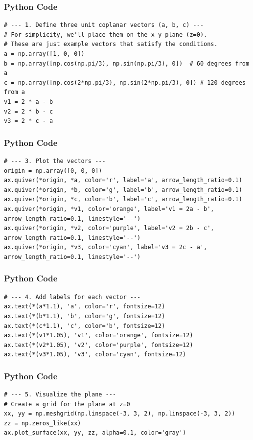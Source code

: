 \documentclass{beamer}
\begin{document}
\begin{frame}[fragile]
    \frametitle{Python Code}
    \begin{lstlisting}
# --- 1. Define three unit coplanar vectors (a, b, c) ---
# For simplicity, we'll place them on the x-y plane (z=0).
# These are just example vectors that satisfy the conditions.
a = np.array([1, 0, 0])
b = np.array([np.cos(np.pi/3), np.sin(np.pi/3), 0])  # 60 degrees from a
c = np.array([np.cos(2*np.pi/3), np.sin(2*np.pi/3), 0]) # 120 degrees from a
v1 = 2 * a - b
v2 = 2 * b - c
v3 = 2 * c - a

    \end{lstlisting}
\end{frame}
\begin{frame}[fragile]
    \frametitle{Python Code}

    \begin{lstlisting}
# --- 3. Plot the vectors ---
origin = np.array([0, 0, 0])
ax.quiver(*origin, *a, color='r', label='a', arrow_length_ratio=0.1)
ax.quiver(*origin, *b, color='g', label='b', arrow_length_ratio=0.1)
ax.quiver(*origin, *c, color='b', label='c', arrow_length_ratio=0.1)
ax.quiver(*origin, *v1, color='orange', label='v1 = 2a - b', arrow_length_ratio=0.1, linestyle='--')
ax.quiver(*origin, *v2, color='purple', label='v2 = 2b - c', arrow_length_ratio=0.1, linestyle='--')
ax.quiver(*origin, *v3, color='cyan', label='v3 = 2c - a', arrow_length_ratio=0.1, linestyle='--')

    \end{lstlisting}
\end{frame}

\begin{frame}[fragile]
    \frametitle{Python Code}

    \begin{lstlisting}
# --- 4. Add labels for each vector ---
ax.text(*(a*1.1), 'a', color='r', fontsize=12)
ax.text(*(b*1.1), 'b', color='g', fontsize=12)
ax.text(*(c*1.1), 'c', color='b', fontsize=12)
ax.text(*(v1*1.05), 'v1', color='orange', fontsize=12)
ax.text(*(v2*1.05), 'v2', color='purple', fontsize=12)
ax.text(*(v3*1.05), 'v3', color='cyan', fontsize=12)
\end{lstlisting}
\end{frame}

 
\begin{frame}[fragile]
    \frametitle{Python Code}
    \begin{lstlisting}
# --- 5. Visualize the plane ---
# Create a grid for the plane at z=0
xx, yy = np.meshgrid(np.linspace(-3, 3, 2), np.linspace(-3, 3, 2))
zz = np.zeros_like(xx)
ax.plot_surface(xx, yy, zz, alpha=0.1, color='gray')

\end{lstlisting}
\end{frame}
\end{document}
